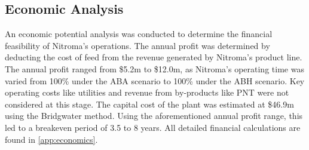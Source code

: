 \subsection{Economic Analysis}
An economic potential analysis was conducted to determine the financial feasibility of Nitroma’s operations. The annual profit was determined by deducting the cost of feed from the revenue generated by Nitroma's product line. The annual profit ranged from \$5.2m to \$12.0m, as Nitroma's operating time was varied from 100\% under the ABA scenario to 100\% under the ABH scenario. Key operating costs like utilities and revenue from by-products like PNT were not considered at this stage. The capital cost of the plant was estimated at \$46.9m using the Bridgwater method. Using the aforementioned annual profit range, this led to a breakeven period of 3.5 to 8 years. All detailed financial calculations are found in \cref{app:economics}.